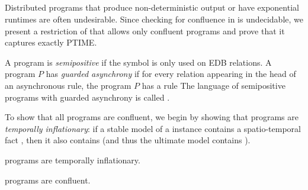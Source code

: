 
\subsection{\large \bf \slang}
\label{sec:plus}

Distributed programs that produce non-deterministic output or have exponential runtimes are often undesirable. Since checking for
confluence in \lang is undecidable, we present a restriction of \lang
that allows only confluent programs and prove that it captures exactly PTIME.

A \lang program is {\em semipositive} if the \dedalus{$\lnot$} symbol is only used on EDB relations.
A \lang program $P$ has {\em guarded asynchrony} if for every relation  appearing in the head of an asynchronous rule, the program $P$ has a rule  The language of semipositive \lang programs with guarded
asynchrony is called \slang.

To show that all \slang programs are confluent, we begin by showing that \slang
programs are {\em temporally inflationary}: if a stable model of a \slang
instance contains a spatio-temporal fact , then it also contains
 (and thus the ultimate model contains ).

\begin{lemma}
\label{lem:inflationary}
\slang programs are temporally inflationary.
\end{lemma}


\begin{theorem}
\label{thm:confluence}
\slang programs are confluent.
\end{theorem}

